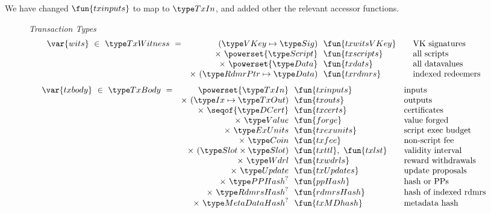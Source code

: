 We have changed $\fun{txinputs}$ to map to $\TxIn$, and added other the relevant
accessor functions.

\begin{figure*}[htb]
  \emph{Transaction Types}
  \begin{equation*}
    \begin{array}{r@{~~}r@{~~}l@{\qquad}l}
      \var{wits} ~\in~ \TxWitness ~=~
       & (\VKey \mapsto \Sig) & \fun{txwitsVKey} & \text{VK signatures}\\
       & \times ~\powerset{\Script}  & \fun{txscripts} & \text{all scripts}\\
       & \times~ \powerset{\Data} & \fun{txdats} & \text{all datavalues}\\
       & \times ~(\RdmrPtr \mapsto \Data)& \fun{txrdmrs}& \text{indexed redeemers}\\
    \end{array}
  \end{equation*}
  \begin{equation*}
    \begin{array}{r@{~~}r@{~~}l@{\qquad}l}
      \var{txbody} ~\in~ \TxBody ~=~
      & \powerset{\TxIn} & \fun{txinputs}& \text{inputs}\\
      &\times ~(\Ix \mapsto \TxOut) & \fun{txouts}& \text{outputs}\\
      & \times~ \seqof{\DCert} & \fun{txcerts}& \text{certificates}\\
       & \times ~\Value  & \fun{forge} &\text{value forged}\\
       & \times ~\ExUnits  & \fun{txexunits}& \text{script exec budget}\\
       & \times ~\Coin & \fun{txfee} &\text{non-script fee}\\
       & \times ~(\Slot\times\Slot) & \fun{txttl},~\fun{txlst} & \text{validity interval}\\
       & \times~ \Wdrl  & \fun{txwdrls} &\text{reward withdrawals}\\
       & \times ~\Update  & \fun{txUpdates} & \text{update proposals}\\
       & \times ~\PPHash^?  & \fun{ppHash} & \text{hash or PPs}\\
       & \times ~\RdmrsHash^? & \fun{rdmrsHash} & \text{hash of indexed rdmrs}\\
       & \times ~\MetaDataHash^? & \fun{txMDhash} & \text{metadata hash}\\
    \end{array}
  \end{equation*}

\end{figure*}
